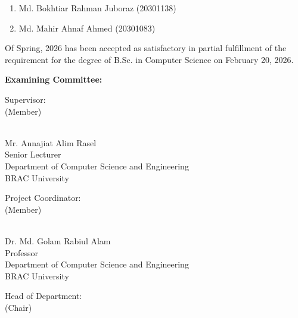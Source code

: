 \documentclass[12pt,a4paper]{report}
\begin{document}
\begin{enumerate}
\item Md. Bokhtiar Rahman Juboraz (20301138)
\item Md. Mahir Ahnaf Ahmed (20301083)
\end{enumerate}

Of Spring, 2026 has been accepted as satisfactory in partial fulfillment of the requirement for the degree of B.Sc. in Computer Science on February 20, 2026.

\vspace{1cm}

\textbf{Examining Committee:}

\vspace{1.5cm}

\begin{flushleft}
Supervisor:\\
(Member)
\end{flushleft}

\begin{flushright}
\vspace{-0.5cm}
\hrulefill\\
Mr. Annajiat Alim Rasel\\
Senior Lecturer\\
Department of Computer Science and Engineering\\
BRAC University
\end{flushright}

\vspace{1.5cm}

\begin{flushleft}
Project Coordinator:\\
(Member)
\end{flushleft}

\begin{flushright}
\vspace{-0.5cm}
\hrulefill\\
Dr. Md. Golam Rabiul Alam\\
Professor\\
Department of Computer Science and Engineering\\
BRAC University
\end{flushright}

\newpage

\vspace{1.5cm}

\begin{flushleft}
Head of Department:\\
(Chair)
\end{flushleft}
\end{document}
